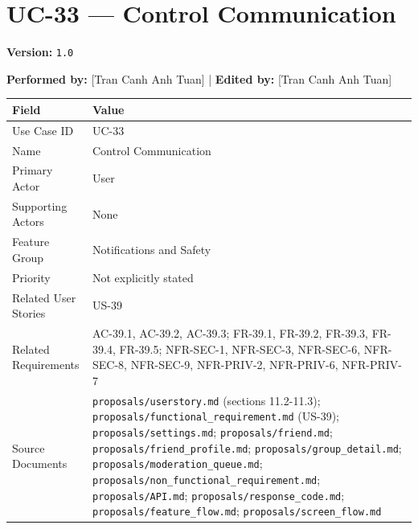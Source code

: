\documentclass[12pt]{article}
\renewcommand{\baselinestretch}{1.5}
\begin{document}
\pagebreak
\hypertarget{sec:uc-33-control-communication}{}
\section*{UC-33 --- Control Communication}
\par\medskip

\textbf{Version:} \texttt{1.0}
\par\medskip

\textbf{Performed by:} [Tran Canh Anh Tuan] | \textbf{Edited by:} [Tran Canh Anh Tuan]
\par\medskip

\begingroup
\small
\renewcommand{\baselinestretch}{1.0}\selectfont
\renewcommand{\arraystretch}{1.15}
\setlength{\tabcolsep}{6pt}
\begin{longtable}{|>{\raggedright\arraybackslash}p{}|>{\raggedright\arraybackslash}p{}|}
\hline
\textbf{Field} & \textbf{Value} \\ \hline
\endhead
Use Case ID & UC-33 \\ \hline
Name & Control Communication \\ \hline
Primary Actor & User \\ \hline
Supporting Actors & None \\ \hline
Feature Group & Notifications and Safety \\ \hline
Priority & Not explicitly stated \\ \hline
Related User Stories & US-39 \\ \hline
Related Requirements & AC-39.1, AC-39.2, AC-39.3; FR-39.1, FR-39.2, FR-39.3, FR-39.4, FR-39.5; NFR-SEC-1, NFR-SEC-3, NFR-SEC-6, NFR-SEC-8, NFR-SEC-9, NFR-PRIV-2, NFR-PRIV-6, NFR-PRIV-7 \\ \hline
Source Documents & \texttt{proposals/userstory.md} (sections 11.2-11.3); \texttt{proposals/functional\_requirement.md} (US-39); \texttt{proposals/settings.md}; \texttt{proposals/friend.md}; \texttt{proposals/friend\_profile.md}; \texttt{proposals/group\_detail.md}; \texttt{proposals/moderation\_queue.md}; \texttt{proposals/non\_functional\_requirement.md}; \texttt{proposals/API.md}; \texttt{proposals/response\_code.md}; \texttt{proposals/feature\_flow.md}; \texttt{proposals/screen\_flow.md} \\ \hline
\end{longtable}
\endgroup
\par\medskip
\end{document}
